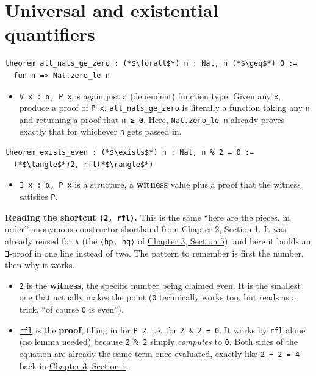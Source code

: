 \section{Universal and existential quantifiers}\label{sec:03-propositions-and-proofs:06-quantifiers:1}

\begin{lstlisting}
theorem all_nats_ge_zero : (*$\forall$*) n : Nat, n (*$\geq$*) 0 :=
  fun n => Nat.zero_le n
\end{lstlisting}

\begin{itemize}
\tightlist
\item
  \texttt{∀ x : α, P x} is again just a (dependent) function type. Given any \texttt{x}, produce a proof of \texttt{P x}. \texttt{all\_\allowbreak{}nats\_\allowbreak{}ge\_\allowbreak{}zero} is literally a function taking any \texttt{n} and returning a proof that \texttt{n ≥ 0}. Here, \texttt{Nat.zero\_\allowbreak{}le n} already proves exactly that for whichever \texttt{n} gets passed in.
\end{itemize}

\begin{lstlisting}
theorem exists_even : (*$\exists$*) n : Nat, n % 2 = 0 :=
  (*$\langle$*)2, rfl(*$\rangle$*)
\end{lstlisting}

\begin{itemize}
\tightlist
\item
  \texttt{∃ x : α, P x} is a structure, a \textbf{witness} value plus a proof that the witness satisfies \texttt{P}.
\end{itemize}

\textbf{Reading the shortcut \texttt{⟨2, rfl⟩}.} This is the same ``here are the pieces, in order'' anonymous-constructor shorthand from \hyperref[sec:02-functions-and-structures:01-structure-basics:1]{Chapter 2, Section 1}. It was already reused for \texttt{∧} (the \texttt{⟨hp, hq⟩} of \hyperref[sec:03-propositions-and-proofs:05-and-or-not:1]{Chapter 3, Section 5}), and here it builds an \texttt{∃}-proof in one line instead of two. The pattern to remember is first the number, then why it works.

\begin{itemize}
\tightlist
\item
  \texttt{2} is the \textbf{witness}, the specific number being claimed even. It is the smallest one that actually makes the point (\texttt{0} technically works too, but reads as a trick, ``of course \texttt{0} is even'').
\item
  \href{https://lean-lang.org/doc/reference/latest/Tactic-Proofs/Tactic-Reference/}{\texttt{rfl}} is the \textbf{proof}, filling in for \texttt{P 2}, i.e.~for \texttt{2 \% 2 = 0}. It works by \texttt{rfl} alone (no lemma needed) because \texttt{2 \% 2} simply \emph{computes} to \texttt{0}. Both sides of the equation are already the same term once evaluated, exactly like \texttt{2 + 2 = 4} back in \hyperref[sec:03-propositions-and-proofs:01-prop:1]{Chapter 3, Section 1}.
\end{itemize}

